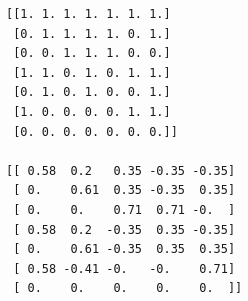 \documentclass{article}
\begin{document}
\begin{cxt} %
\end{cxt}
\begin{verbatim}
[[1. 1. 1. 1. 1. 1. 1.]
 [0. 1. 1. 1. 1. 0. 1.]
 [0. 0. 1. 1. 1. 0. 0.]
 [1. 1. 0. 1. 0. 1. 1.]
 [0. 1. 0. 1. 0. 0. 1.]
 [1. 0. 0. 0. 0. 1. 1.]
 [0. 0. 0. 0. 0. 0. 0.]]

[[ 0.58  0.2   0.35 -0.35 -0.35]
 [ 0.    0.61  0.35 -0.35  0.35]
 [ 0.    0.    0.71  0.71 -0.  ]
 [ 0.58  0.2  -0.35  0.35 -0.35]
 [ 0.    0.61 -0.35  0.35  0.35]
 [ 0.58 -0.41 -0.   -0.    0.71]
 [ 0.    0.    0.    0.    0.  ]]

\end{verbatim}

\end{document}
